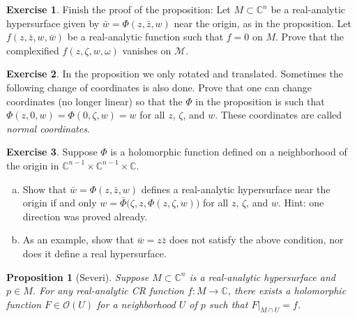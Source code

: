 \documentclass[12pt,openany]{book}
\newcommand{\C}{{\mathbb{C}}}
\newcommand{\sM}{{\mathscr{M}}}
\newcommand{\sO}{{\mathscr{O}}}
\newcommand{\myindex}[1]{#1\index{#1}}
\theoremstyle{plain}
\newtheorem{prop}[thm]{Proposition}
\theoremstyle{remark}
\theoremstyle{definition}
\newenvironment{exbox}{%
    \def\FrameCommand{\vrule width 1pt \relax\hspace {10pt}}%
    \MakeFramed {\advance \hsize -\width \FrameRestore }%
}{%
    \endMakeFramed
}
\newenvironment{exparts}{%
    \leavevmode\begin{enumerate}[a),noitemsep,topsep=0pt,parsep=0pt,partopsep=0pt]
}{%
    \end{enumerate}
}
\theoremstyle{exercise}
\newtheorem{exercise}{Exercise}[section]
\theoremstyle{example}
\begin{document}
\begin{exbox}
\begin{exercise}
Finish the proof of the proposition:
Let $M\subset \C^n$ be a real-analytic hypersurface given by
$\bar{w} = \Phi(z,\bar{z},w)$ near the origin, as in the proposition.  Let
$f(z,\bar{z},w,\bar{w})$ be a real-analytic function such that $f=0$
on $M$.  Prove that the complexified $f(z,\zeta,w,\omega)$ vanishes on
$\sM$.
\end{exercise}

\begin{exercise}
In the proposition we only rotated and translated.  Sometimes the following
change of coordinates is also done.  Prove that one can change coordinates
(no longer linear) so that the $\Phi$ in the proposition is
such that $\Phi(z,0,w) = \Phi(0,\zeta,w) = w$ for all $z$, $\zeta$, and $w$.
These coordinates are called \emph{\myindex{normal coordinates}}.
\end{exercise}

\begin{exercise}
Suppose
$\Phi$ is a holomorphic function defined on a neighborhood of the origin
in $\C^{n-1} \times \C^{n-1} \times \C$.
\begin{exparts}
\item
Show that $\bar{w} = \Phi(z,\bar{z},w)$ defines a real-analytic hypersurface
near the origin if and only 
$w = \bar{\Phi}\bigl(\zeta,z,\Phi(z,\zeta,w)\bigr)$
for all $z$, $\zeta$, and $w$.  Hint: one direction was proved already.
\item
As an example, show that $\bar{w} = z\bar{z}$ does not satisfy the above
condition, nor does it define a real hypersurface.
\end{exparts}
\end{exercise}
\end{exbox}

\begin{prop}[Severi] \label{prop:severi}
Suppose $M \subset \C^n$ is a real-analytic hypersurface and $p \in M$.
For any real-analytic CR function $f \colon M \to \C$, there exists
a holomorphic function $F \in \sO(U)$ for a neighborhood $U$ of $p$
such that $F|_{M \cap U} = f$.
\end{prop}
\end{document}
